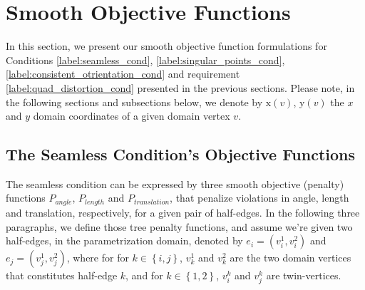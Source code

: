 \section{Smooth Objective Functions}
In this section, we present our smooth objective function formulations for Conditions \ref{label:seamless_cond}, \ref{label:singular_points_cond}, \ref{label:consistent_otrientation_cond} and requirement \ref{label:quad_distortion_cond} presented in the previous sections. Please note, in the following sections and subsections below, we denote by $\mathrm{x}\left(v\right)$, $\mathrm{y}\left(v\right)$ the $x$ and $y$ domain coordinates of a given domain vertex $v$.
\subsection{The Seamless Condition's Objective Functions}
The seamless condition can be expressed by three smooth objective (penalty) functions $P_{angle}$, $P_{length}$ and $P_{translation}$, that penalize violations in angle, length and translation, respectively, for a given pair of half-edges. In the following three paragraphs, we define those tree penalty functions, and assume we're given two half-edges, in the parametrization domain, denoted by $e_i = \left(v_i^1,v_i^2\right)$ and $e_j = \left(v_j^1,v_j^2\right)$, where for for $k \in \left\{i,j\right\}$, $v_k^1$ and $v_k^2$ are the two domain vertices that constitutes half-edge $k$, and for $k \in \left\{1,2\right\}$, $v_i^k$ and $v_j^k$ are twin-vertices.
